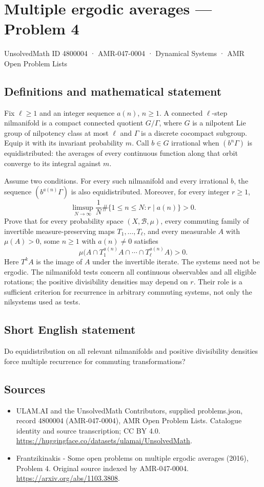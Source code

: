 \documentclass[11pt,a4paper]{article}
\begin{document}
\section*{Multiple ergodic averages — Problem 4}\label{4800004}
{\small UnsolvedMath ID 4800004 · AMR-047-0004 · Dynamical Systems · AMR Open Problem Lists}
\subsection{Definitions and mathematical statement}
Fix $\ell\ge1$ and an integer sequence $a(n)$, $n\ge1$.
A connected $\ell$-step nilmanifold is a compact connected
quotient $G/\Gamma$, where $G$ is a nilpotent Lie group of
nilpotency class at most $\ell$ and $\Gamma$ is a discrete
cocompact subgroup. Equip it with its invariant probability $m$.
Call $b\in G$ irrational when $(b^n\Gamma)$ is equidistributed:
the averages of every continuous function along that orbit
converge to its integral against $m$.

Assume two conditions. For every such nilmanifold and every
irrational $b$, the sequence $(b^{a(n)}\Gamma)$ is also
equidistributed. Moreover, for every integer $r\ge1$,
\[
 \limsup_{N\to\infty}\frac1N
          \#\{1\le n\le N:r\mid a(n)\}>0.
\]
Prove that for every probability space $(X,\mathcal B,\mu)$,
every commuting family of invertible measure-preserving maps
$T_1,\ldots,T_\ell$, and every measurable $A$ with $\mu(A)>0$,
some $n\ge1$ with $a(n)\ne0$ satisfies
\[
          \mu\bigl(A\cap T_1^{a(n)}A\cap\cdots
                         \cap T_\ell^{a(n)}A\bigr)>0.
\]
Here $T^kA$ is the image of $A$ under the invertible iterate.
The systems need not be ergodic. The nilmanifold tests concern
all continuous observables and all eligible rotations; the
positive divisibility densities may depend on $r$. Their role
is a sufficient criterion for recurrence in arbitrary commuting
systems, not only the nilsystems used as tests.
\subsection{Short English statement}
Do equidistribution on all relevant nilmanifolds and positive divisibility densities force multiple recurrence for commuting transformations?
\subsection{Sources}
\begin{itemize}
\item[S1] ULAM.AI and the UnsolvedMath Contributors, supplied problems.json, record 4800004 (AMR-047-0004), AMR Open Problem Lists. Catalogue identity and source transcription; CC BY 4.0.
\url{https://huggingface.co/datasets/ulamai/UnsolvedMath}.
\item[S2] Frantzikinakis - Some open problems on multiple ergodic averages (2016), Problem 4. Original source indexed by AMR-047-0004.
\url{https://arxiv.org/abs/1103.3808}.
\end{itemize}
\end{document}
